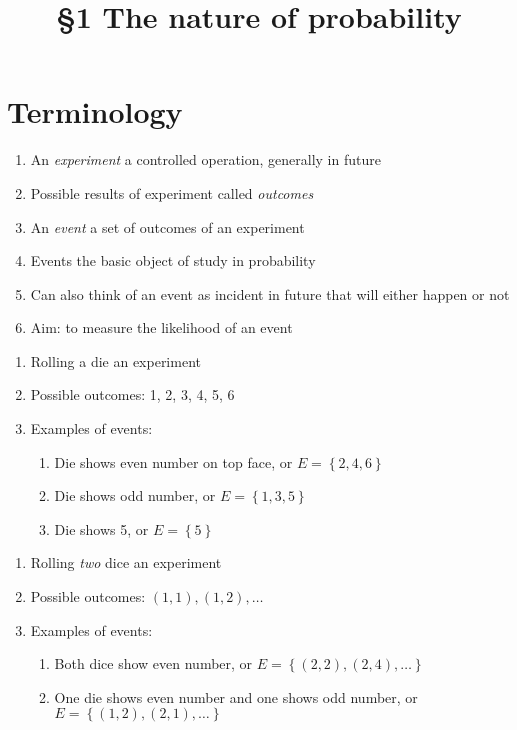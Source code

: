 \documentclass{ximera}
\title{\S1 The nature of probability}
\begin{document}
\maketitle

\section{Terminology}
\begin{enumerate}
\item An {\em experiment} a controlled operation,
generally in future
\item Possible results of experiment called {\em outcomes}
\item An {\em event} a set of outcomes of an experiment
\item Events the basic object of study in probability
\item Can also think of an event as incident in future
that will either happen or not
\item Aim: to measure the likelihood of an event
\end{enumerate}

\begin{example}
\begin{enumerate}
\item Rolling a die an experiment
\item Possible outcomes: 1, 2, 3, 4, 5, 6
\item Examples of events:
\begin{enumerate}
\item Die shows even number on top face, or $E=\left\{2,4,6\right\}$
\item Die shows odd number, or $E=\left\{1,3,5\right\}$
\item Die shows 5, or $E=\left\{5\right\}$
\end{enumerate}
\end{enumerate}
\end{example}

\begin{example}
\begin{enumerate}
\item Rolling {\em two} dice an experiment
\item Possible outcomes: $\left(1,1\right),\left(1,2\right),\ldots$
\item Examples of events:
\begin{enumerate}
\item Both dice show even number, or $E=\left\{\left(2,2\right),
\left(2,4\right),\ldots\right\}$
\item One die shows even number and one shows odd number,
or $E=\left\{\left(1,2\right),\left(2,1\right),\ldots\right\}$
\end{enumerate}
\end{enumerate}
\end{example}
\end{document}
